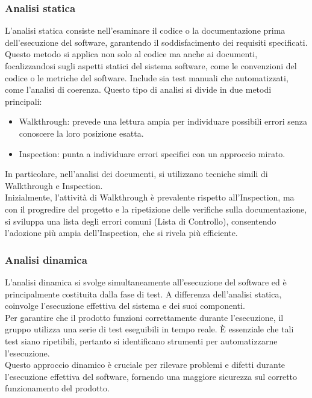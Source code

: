\documentclass{article}
\begin{document}
    \subsubsection{Analisi statica}
    L'analisi statica consiste nell'esaminare il codice o la documentazione prima dell'esecuzione del software, garantendo il soddisfacimento dei requisiti specificati. Questo metodo si applica non solo al codice ma anche ai documenti, focalizzandosi sugli aspetti statici del sistema software, come le convenzioni del codice o le metriche del software. Include sia test manuali che automatizzati, come l'analisi di coerenza.
    Questo tipo di analisi si divide in due metodi principali: 

    \begin{itemize}
    \item Walkthrough: prevede una lettura ampia per individuare possibili errori senza conoscere la loro posizione esatta.
    \item Inspection: punta a individuare errori specifici con un approccio mirato.
    \end{itemize}
    In particolare, nell'analisi dei documenti, si utilizzano tecniche simili di Walkthrough e Inspection.\\
    Inizialmente, l'attività di Walkthrough è prevalente rispetto all'Inspection, ma con il progredire del progetto e la ripetizione delle verifiche sulla documentazione, si sviluppa una lista degli errori comuni (Lista di Controllo), consentendo l'adozione più ampia dell'Inspection, che si rivela più efficiente.
    \subsubsection{Analisi dinamica}
    L'analisi dinamica si svolge simultaneamente all'esecuzione del software ed è principalmente costituita dalla fase di test. A differenza dell'analisi statica, coinvolge l'esecuzione effettiva del sistema e dei suoi componenti.\\
    Per garantire che il prodotto funzioni correttamente durante l'esecuzione, il gruppo utilizza una serie di test eseguibili in tempo reale. È essenziale che tali test siano ripetibili, pertanto si identificano strumenti per automatizzarne l'esecuzione.\\
    Questo approccio dinamico è cruciale per rilevare problemi e difetti durante l'esecuzione effettiva del software, fornendo una maggiore sicurezza sul corretto funzionamento del prodotto.
    
\end{document}
